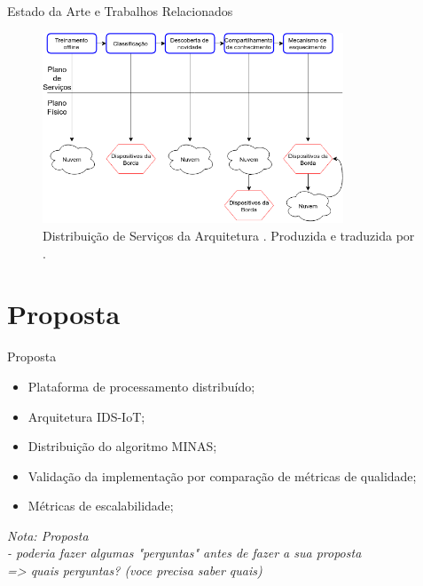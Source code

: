 \documentclass[aspectratio=43,10pt]{beamer}
\newcommand{\nota}[1]{\hspace*{-0.5cm}\textit{{\color[rgb]{1,0,0}Nota: #1}}}
\begin{document}
\begin{frame}[fragile]{Estado da Arte e Trabalhos Relacionados}
\begin{figure}[ht]
  \centering
  \includegraphics[width=0.8\textwidth]{figuras/idsa-iot-quali-004.png}
  \caption{Distribuição de Serviços da Arquitetura \idsiot.
  Produzida e traduzida por .}
  \label{fig:ids-iot}
\end{figure}
\end{frame}

\newcommand{\mfog}{sistema M-FOG\xspace}

\section{Proposta}
\begin{frame}[fragile]{Proposta}
\begin{itemize}
\item Plataforma de processamento distribuído;
\item Arquitetura IDS-IoT;
\item Distribuição do algoritmo MINAS;
\item Validação da implementação por comparação de métricas de qualidade;
\item Métricas de escalabilidade;
\end{itemize}
\nota{Proposta\\
- poderia fazer algumas "perguntas" antes de fazer a sua proposta\\
=> quais perguntas? (voce precisa saber quais)}
\end{frame}


\newcommand{\source}{módulo auxiliar \emph{source}\xspace}
\newcommand{\sink}{módulo auxiliar \emph{sink}\xspace}

\newcommand{\offline}{módulo treinamento\xspace}
\newcommand{\classify}{módulo classificador\xspace}
\newcommand{\detector}{módulo detector de novidades\xspace}
\end{document}
